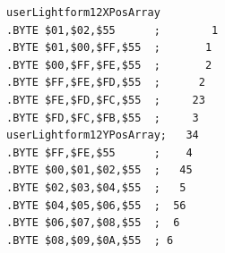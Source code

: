 \begin{minipage}[b]{0.48\linewidth}
\vspace{2cm}
\begin{lrbox}{\mybox}%
\hspace{1cm}
\begin{lstlisting}[basicstyle=\ttfamily\tiny,escapechar=\%]
userLightform12XPosArray
.BYTE $01,$02,$55      ;        1
.BYTE $01,$00,$FF,$55  ;       1 
.BYTE $00,$FF,$FE,$55  ;       2 
.BYTE $FF,$FE,$FD,$55  ;      2  
.BYTE $FE,$FD,$FC,$55  ;     23  
.BYTE $FD,$FC,$FB,$55  ;     3   
userLightform12YPosArray;   34  
.BYTE $FF,$FE,$55      ;    4   
.BYTE $00,$01,$02,$55  ;   45   
.BYTE $02,$03,$04,$55  ;   5    
.BYTE $04,$05,$06,$55  ;  56    
.BYTE $06,$07,$08,$55  ;  6     
.BYTE $08,$09,$0A,$55  ; 6      
\end{lstlisting}
\end{lrbox}%
\scalebox{0.8}{\usebox{\mybox}}

\end{minipage}
%
\clearpage
%
%
